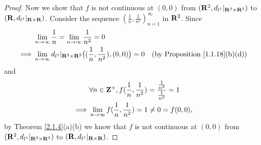 \begin{proof}
    Now we show that \(f\) is not continuous at \((0, 0)\) from \((\mathbf{R}^2, d_{l^1}|_{\mathbf{R}^2 \times \mathbf{R}^2})\) to \((\mathbf{R}, d_{l^1}|_{\mathbf{R} \times \mathbf{R}})\).
    Consider the sequence \((\frac{1}{n}, \frac{1}{n^2})_{n = 1}^\infty\) in \(\mathbf{R}^2\).
    Since
    \begin{align*}
                 & \lim_{n \to \infty} \frac{1}{n} = \lim_{n \to \infty} \frac{1}{n^2} = 0                                                                        \\
        \implies & \lim_{n \to \infty} d_{l^1}|_{\mathbf{R}^2 \times \mathbf{R}^2}\big((\frac{1}{n}, \frac{1}{n^2}), (0, 0)\big) = 0 & \text{(by Proposition \ref{1.1.18}(b)(d))}
    \end{align*}
    and
    \begin{align*}
                 & \forall n \in \mathbf{Z}^+, f(\frac{1}{n}, \frac{1}{n^2}) = \frac{\frac{1}{n^2}}{\frac{1}{n^2}} = 1 \\
        \implies & \lim_{n \to \infty} f(\frac{1}{n}, \frac{1}{n^2}) = 1 \neq 0 = f(0, 0),
    \end{align*}
    by Theorem \ref{2.1.4}(a)(b) we know that \(f\) is not continuous at \((0, 0)\) from \((\mathbf{R}^2, d_{l^1}|_{\mathbf{R}^2 \times \mathbf{R}^2})\) to \((\mathbf{R}, d_{l^1}|_{\mathbf{R} \times \mathbf{R}})\).
\end{proof}
